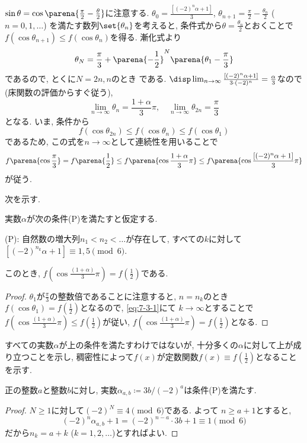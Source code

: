 

 $\sin{\theta} = \cos{\parena{\frac{\pi}{2} - \frac{\theta}{2}}}$に注意する. $\theta_{0}=\frac{[(-2)^n \alpha +1]}{3}$,
 $\theta_{n+1}=\frac{\pi}{2} - \frac{\theta_{n}}{2}$ ($n=0,1,\dots$) を満たす数列$\set{\theta_{n}}$を考えると, 条件式から$\theta = \frac{\theta_n}{2}$とおくことで $f(\cos{\theta_{n+1}})\leq f(\cos{\theta_{n}})$を得る.
漸化式より
 \[\theta_{N} = \frac{\pi}{3} + \parena{-\frac{1}{2}}^{N}\parena{\theta_1 - \frac{\pi}{3}}\]
 であるので, とくに$N=2n,n$のとき
である. $\disp\lim_{n\to \infty} \frac{[(-2)^n\alpha + 1]}{3\cdot (-2)^n} = \frac{\alpha}{3}$なので(床関数の評価からすぐ従う),
\[
\lim_{n\to \infty} \theta_n = \frac{1+\alpha}{3}\pi ,\quad \lim_{n\to\infty} \theta_{2n} = \frac{\pi}{3}
\]
となる. いま, 条件から
\begin{equation} \label{eq:7-3-1}
f(\cos{\theta_{2n}}) \leq f(\cos{\theta_n}) \leq f(\cos{\theta_1})
\end{equation}
であるため, この式を$n\to \infty$として連続性を用いることで
\[
f\parena{\cos{\frac{\pi}{3}}} = f\parena{\frac{1}{2}} \leq f\parena{\cos{\frac{1+\alpha}{3}\pi }} \leq f\parena{\cos{\frac{[(-2)^n\alpha + 1]}{3}\pi}}
\]
が従う.

次を示す.
\begin{lem}\label{on_(P)_constant}
実数$\alpha$が次の条件(P)を満たすと仮定する.
\begin{center}
(P): 自然数の増大列$n_1 < n_2 < \dots$が存在して, すべての$k$に対して $[(-2)^{n_k}\alpha + 1]\equiv 1,5\pmod{6}$.
\end{center}
このとき, $f(\cos{\frac{(1+\alpha)}{3}\pi}) = f(\frac{1}{2})$である.
\end{lem}
\begin{proof}
$\theta_1$が$\frac{\pi}{3}$の整数倍であることに注意すると, $n=n_k$のとき $f(\cos{\theta_1}) = f(\frac{1}{2})$となるので, \cref{eq:7-3-1}にて $k\to \infty$とすることで$f(\cos{\frac{(1+\alpha)}{3}\pi}) \leq f(\frac{1}{2})$が従い, $f(\cos{\frac{(1+\alpha)}{3}\pi}) = f(\frac{1}{2})$となる.
\end{proof}
すべての実数$\alpha$が上の条件を満たすわけではないが, 十分多くの$\alpha$に対して上が成り立つことを示し, 稠密性によって$f(x)$が定数関数$f(x) \equiv f(\frac{1}{2})$となることを示す.

\begin{lem} \label{lem:alpha_an_bn}
正の整数$a$と整数$b$に対し, 実数$\alpha_{a,b} \coloneqq 3b/(-2)^a$は条件(P)を満たす.
\end{lem}
\begin{proof}
$N\geq 1$に対して$(-2)^N \equiv 4\pmod{6}$である. よって
$n\geq a+1$とすると,
\[(-2)^n \alpha_{a,b} + 1 = (-2)^{n-a}\cdot 3b + 1 \equiv 1\pmod{6}\]
だから$n_k = a + k$ ($k=1,2,\dots$)とすればよい.
\end{proof}


